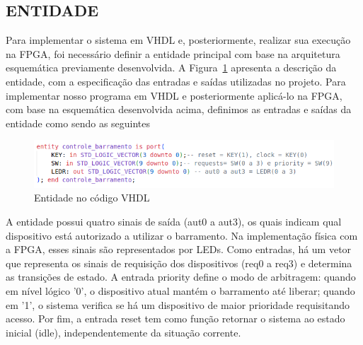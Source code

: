 \documentclass[oneside]{uffstex}
\begin{document}
\subsection{ENTIDADE}
Para implementar o sistema em VHDL e, posteriormente, realizar sua execução na FPGA, foi necessário definir a entidade principal com base na arquitetura esquemática previamente desenvolvida. A Figura~\ref{fig:entidade} apresenta a descrição da entidade, com a especificação das entradas e saídas utilizadas no projeto.
Para implementar nosso programa em VHDL e posteriormente aplicá-lo na FPGA, com base na esquemática desenvolvida acima, definimos as entradas e saídas da entidade como sendo as seguintes
\begin{figure}[H]
    \centering
    \includegraphics[width=1.0\linewidth]{ENTITY.png}
    \caption{Entidade no código VHDL}
    \label{fig:entidade}
\end{figure}
A entidade possui quatro sinais de saída (aut0 a aut3), os quais indicam qual dispositivo está autorizado a utilizar o barramento. Na implementação física com a FPGA, esses sinais são representados por LEDs. Como entradas, há um vetor que representa os sinais de requisição dos dispositivos (req0 a req3) e determina as transições de estado. A entrada priority define o modo de arbitragem: quando em nível lógico '0', o dispositivo atual mantém o barramento até liberar; quando em '1', o sistema verifica se há um dispositivo de maior prioridade requisitando acesso. Por fim, a entrada reset tem como função retornar o sistema ao estado inicial (idle), independentemente da situação corrente.
\end{document}
